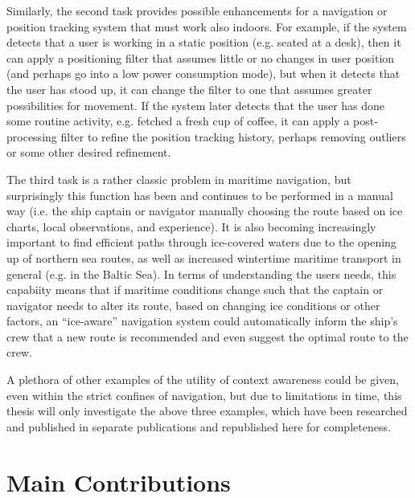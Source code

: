 Similarly, the second task provides possible enhancements for a navigation or position tracking system that must work also indoors. For example, if the system detects that a user is working in a static position (e.g. seated at a desk), then it can apply a positioning filter that assumes little or no changes in user position (and perhaps go into a low power consumption mode), but when it detects that the user has stood up, it can change the filter to one that assumes greater possibilities for movement. If the system later detects that the user has done some routine activity, e.g. fetched a fresh cup of coffee, it can apply a post-processing filter to refine the position tracking history, perhaps removing outliers or some other desired refinement.

The third task is a rather classic problem in maritime navigation, but surprisingly this function has been and continues to be performed in a manual way (i.e. the ship captain or navigator manually choosing the route based on ice charts, local observations, and experience). It is also becoming increasingly important to find efficient paths through ice-covered waters due to the opening up of northern sea routes, as well as increased wintertime maritime transport in general (e.g. in the Baltic Sea). In terms of understanding the users needs, this capabiity means that if maritime conditions change such that the captain or navigator needs to alter its route, based on changing ice conditions or other factors, an ``ice-aware'' navigation system could automatically inform the ship's crew that a new route is recommended and even suggest the optimal route to the crew.

A plethora of other examples of the utility of context awareness could be given, even within the strict confines of navigation, but due to limitations in time, this thesis will only investigate the above three examples, which have been researched and published in separate publications and republished here for completeness.

\section{Main Contributions}
\label{sec:contributions}

